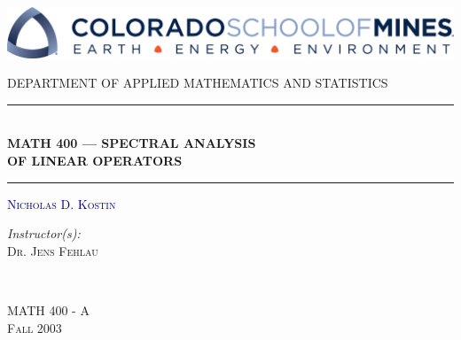 \documentclass{article}
\begin{document}
\thispagestyle{empty}

\centering

\includegraphics[width=\textwidth]{mines.png}

\vspace{2.0em}

\textsc{\large {DEPARTMENT OF APPLIED MATHEMATICS AND STATISTICS}}

\vspace{1.5em}

\rule{\textwidth}{1pt}\\[0.5em]
{\huge {\textbf{MATH 400 --- SPECTRAL ANALYSIS \\[0.5em] OF LINEAR OPERATORS}}}\\[0.5em]
\rule{\textwidth}{1pt}

\vspace{2.4em}

\textsc{\huge \textcolor{DARKBLUE}{\textsc{Nicholas D. Kostin}}}

\vspace{2.4em}

\begin{minipage}{0.4\textwidth}
\begin{flushleft} \large
\emph{Instructor(s):} \\
\textsc{Dr. Jens Fehlau} \\
\end{flushleft}
\end{minipage}
~
\begin{minipage}{0.4\textwidth}
\begin{flushright} \large
\textsc{MATH 400 - A} \\
\textsc{Fall 2003}
\end{flushright}
\end{minipage}

\vfill
\end{document}

